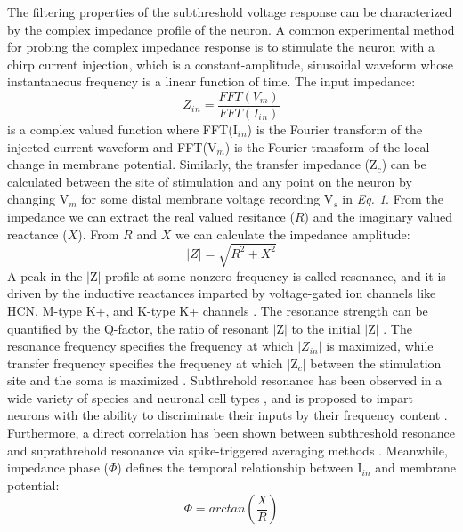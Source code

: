 \documentclass[utf8]{frontiersSCNS} %
\begin{document}
The filtering properties of the subthreshold voltage response can be characterized by the complex impedance profile of the neuron.
A common experimental method for probing the complex impedance response is to stimulate the neuron with a chirp current injection, which
is a constant-amplitude, sinusoidal waveform whose instantaneous frequency is a linear function of time.  The input impedance:
\begin{equation}  Z_i{_n} = \frac{FFT(V_m)}{FFT(I_i{_n})} \label{eq:01}\end{equation}
is a complex valued function where FFT(I$_i{_n}$) is the Fourier transform of the injected current waveform and FFT(V$_m$) is the Fourier
transform of the local change in membrane potential.  Similarly, the transfer impedance (Z$_c$) can be calculated between the site of stimulation
and any point on the neuron by changing V$_m$ for some distal membrane voltage recording V$_s$ in \emph{Eq. 1}. From the impedance we can
extract the real valued resitance ($R$) and the imaginary valued reactance ($X$).  From $R$ and $X$ we can calculate the impedance amplitude:
\begin{equation} |Z| = \sqrt{R^2 + X^2} \label{eq:02}\end{equation}
A peak in the $|$Z$|$ profile at some nonzero frequency is called resonance, and it is driven by
the inductive reactances imparted by voltage-gated ion channels like HCN, M-type K+, and 
K-type K+ channels \citep{Das2017-nz}.  The resonance strength can be quantified by the 
Q-factor, the ratio of resonant $|$Z$|$ to the initial $|$Z$|$ \citep{Dewell2019-ra}. The 
resonance frequency specifies the frequency at which $|Z_{in}|$ is maximized, while
transfer frequency specifies the frequency at which $|$Z$_c|$ between the stimulation site and 
the soma is maximized \cite{Dembrow2015-zb}.  Subthrehold resonance has been observed in a wide 
variety of species and neuronal cell types \citep{Crawford1981-av, Puil1988-ca, Hutcheon2000-gs, Yoshida2011-ec, Ulrich2002-dd},
and is proposed to impart neurons with the ability to discriminate their inputs by their 
frequency content \citep{Das2017-nz}. Furthermore, a direct correlation has been shown between subthreshold resonance and suprathrehold
resonance via spike-triggered averaging methods \citep{Das2015-mh}.
Meanwhile, impedance phase ($\Phi$) defines the temporal relationship between I$_{in}$ and membrane potential:
\begin{equation} \Phi = arctan(\frac{X}{R}) \label{eq:03}\end{equation}
\end{document}
